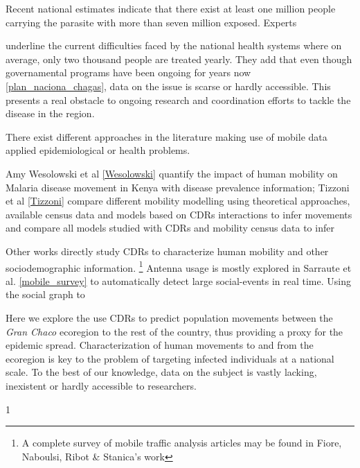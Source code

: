 Recent national estimates indicate that there exist at least one million people carrying the parasite with more than seven million exposed. Experts \begin{comment}  aca como referencio a Diego Weinberg y Mundo Sano? \end{comment} underline the current difficulties faced by the national health systems where on average, only two thousand people are treated yearly. They add that even though governamental programs have been ongoing for years now \ref{plan_naciona_chagas}, data on the issue is scarse or hardly accessible. This presents a real obstacle to ongoing research and coordination efforts to tackle the disease in the region.

There exist different approaches in the literature making use of mobile data applied epidemiological or health problems.\begin{comment} La siguiente info la saco de aqui  https://docs.google.com/document/d/1ZClgYFTLCxmg7wvRXqz2V1EP7Wcg0vd2ZwEBOLW2VOk \end{comment} Amy Wesolowski et al \ref{Wesolowski}  quantify the impact of human mobility on Malaria disease movement in Kenya with disease prevalence information; Tizzoni et al \ref{Tizzoni} compare different mobility modelling using theoretical approaches, available census data and models based on CDRs interactions to infer movements and compare all models studied with CDRs and mobility census data to infer

Other works directly study CDRs to characterize human mobility and other sociodemographic information. \footnote{A complete survey of mobile traffic analysis articles may be found in Fiore, Naboulsi, Ribot & Stanica's work} Antenna usage is mostly explored in Sarraute et al. \ref{mobile_survey} to automatically detect large social-events in real time. Using the social graph to 


Here we explore the use CDRs to predict population movements between the \textit{Gran Chaco} ecoregion to the rest of the country, thus providing a proxy for the epidemic spread. Characterization of human movements to and from the ecoregion is key to the problem of targeting infected individuals at a national scale. To the best of our knowledge, data on the subject is vastly lacking, inexistent or hardly accessible to researchers. 

1
